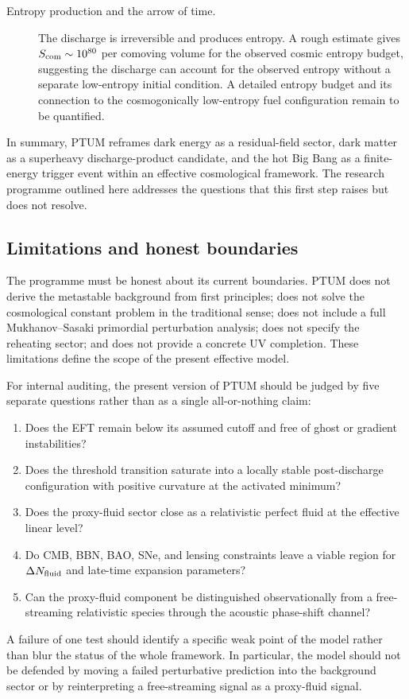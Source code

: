 \documentclass[epj]{svjour}
\begin{document}
\begin{description}
\item[Entropy production and the arrow of time.] 
The discharge is irreversible and produces entropy. A rough estimate
gives $S_{\rm com}\sim10^{80}$ per comoving volume for the
observed cosmic entropy budget, suggesting the discharge can account
for the observed entropy without a separate low-entropy initial
condition. A detailed entropy budget and its connection to the
cosmogonically low-entropy fuel configuration remain to be
quantified.

\end{description}

In summary, PTUM reframes dark energy as a residual-field sector,
dark matter as a superheavy discharge-product candidate, and the hot
Big Bang as a finite-energy trigger event within an effective
cosmological framework. The research
programme outlined here addresses the questions that this first step
raises but does not resolve.

\subsection{Limitations and honest boundaries}
\label{sec:limits}

The programme must be honest about its current boundaries. PTUM
does not derive the metastable background from first principles;
does not solve the cosmological constant problem in the traditional
sense; does not include a full Mukhanov--Sasaki primordial
perturbation analysis; does not specify the reheating sector; and
does not provide a concrete UV completion. These limitations define
the scope of the present effective model.

For internal auditing, the present version of PTUM should be judged by five
separate questions rather than as a single all-or-nothing claim:
\begin{enumerate}[label=(\roman*)]
\item Does the EFT remain below its assumed cutoff and free of ghost or gradient
instabilities?
\item Does the threshold transition saturate into a locally stable post-discharge
configuration with positive curvature at the activated minimum?
\item Does the proxy-fluid sector close as a relativistic perfect fluid at the
effective linear level?
\item Do CMB, BBN, BAO, SNe, and lensing constraints leave a viable region for
$\Delta N_{\rm fluid}$ and late-time expansion parameters?
\item Can the proxy-fluid component be distinguished observationally from a
free-streaming relativistic species through the acoustic phase-shift channel?
\end{enumerate}
A failure of one test should identify a specific weak point of the model rather
than blur the status of the whole framework.  In particular, the model should
not be defended by moving a failed perturbative prediction into the background
sector or by reinterpreting a free-streaming signal as a proxy-fluid signal.
\end{document}
